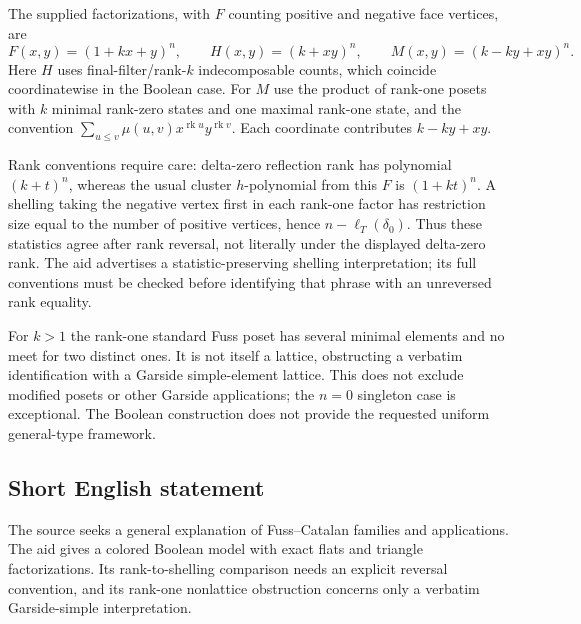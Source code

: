 \documentclass[11pt]{article}
\begin{document}
The supplied factorizations, with $F$ counting positive and negative face vertices, are
\[
 F(x,y)=(1+kx+y)^n,\qquad H(x,y)=(k+xy)^n,\qquad
 M(x,y)=(k-ky+xy)^n.
\]
Here $H$ uses final-filter/rank-$k$ indecomposable counts, which coincide coordinatewise in the Boolean case. For $M$ use the product of rank-one posets with $k$ minimal rank-zero states and one maximal rank-one state, and the convention $\sum_{u\le v}\mu(u,v)x^{\operatorname{rk}u}y^{\operatorname{rk}v}$. Each coordinate contributes $k-ky+xy$.

Rank conventions require care: delta-zero reflection rank has polynomial $(k+t)^n$, whereas the usual cluster $h$-polynomial from this $F$ is $(1+kt)^n$. A shelling taking the negative vertex first in each rank-one factor has restriction size equal to the number of positive vertices, hence $n-\ell_T(\delta_0)$. Thus these statistics agree after rank reversal, not literally under the displayed delta-zero rank. The aid advertises a statistic-preserving shelling interpretation; its full conventions must be checked before identifying that phrase with an unreversed rank equality.

For $k>1$ the rank-one standard Fuss poset has several minimal elements and no meet for two distinct ones. It is not itself a lattice, obstructing a verbatim identification with a Garside simple-element lattice. This does not exclude modified posets or other Garside applications; the $n=0$ singleton case is exceptional. The Boolean construction does not provide the requested uniform general-type framework.
\subsection{Short English statement}
The source seeks a general explanation of Fuss--Catalan families and applications. The aid gives a colored Boolean model with exact flats and triangle factorizations. Its rank-to-shelling comparison needs an explicit reversal convention, and its rank-one nonlattice obstruction concerns only a verbatim Garside-simple interpretation.
\end{document}
